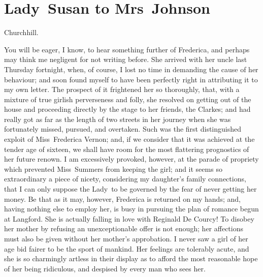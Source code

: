 \chapter{Lady~Susan to Mrs~Johnson}
  
  \begin{mail}{Churchhill.}{}

You will be eager, I know, to hear something further of Frederica, and perhaps may think me negligent for not writing before. She arrived with her uncle last Thursday fortnight, when, of course, I lost no time in demanding the cause of her behaviour; and soon found myself to have been perfectly right in attributing it to my own letter. The prospect of it frightened her so thoroughly, that, with a mixture of true girlish perverseness and folly, she resolved on getting out of the house and proceeding directly by the stage to her friends, the Clarkes; and had really got as far as the length of two streets in her journey when she was fortunately missed, pursued, and overtaken. Such was the first distinguished exploit of Miss~Frederica Vernon; and, if we consider that it was achieved at the tender age of sixteen, we shall have room for the most flattering prognostics of her future renown. I am excessively provoked, however, at the parade of propriety which prevented Miss~Summers from keeping the girl; and it seems so extraordinary a piece of nicety, considering my daughter's family connections, that I can only suppose the Lady~to be governed by the fear of never getting her money. Be that as it may, however, Frederica is returned on my hands; and, having nothing else to employ her, is busy in pursuing the plan of romance begun at Langford. She is actually falling in love with Reginald De Courcy! To disobey her mother by refusing an unexceptionable offer is not enough; her affections must also be given without her mother's approbation. I never saw a girl of her age bid fairer to be the sport of mankind. Her feelings are tolerably acute, and she is so charmingly artless in their display as to afford the most reasonable hope of her being ridiculous, and despised by every man who sees her.


\end{mail}
